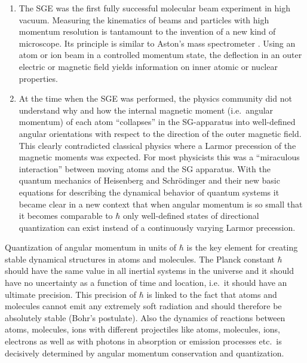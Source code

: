 \documentclass{article}
\begin{document}
\begin{enumerate}
\item The SGE was the first fully successful molecular beam experiment in high vacuum. Measuring the kinematics of beams and particles with high momentum resolution is tantamount to the invention of a new kind of microscope. Its principle is similar to Aston's mass spectrometer \citep{AstonF1919Spectrograph}. Using an atom or ion beam in a controlled momentum state, the deflection in an outer electric or magnetic field yields information on inner atomic or nuclear properties. 
\item At the time when the SGE was performed, the physics community did not understand why and how the internal magnetic moment (i.e.\ angular momentum) of each atom ``collapses'' in the SG-apparatus into well-defined angular orientations with respect to the direction of the outer magnetic field. This clearly contradicted classical physics where a Larmor precession of the magnetic moments was expected. For most physicists this was a ``miraculous interaction'' between moving atoms and the SG apparatus. With the quantum mechanics of Heisenberg and Schrödinger 
and their new basic equations for describing the dynamical behavior of quantum systems it became clear in a new context that when angular momentum is so small that it becomes comparable to $\hbar$ only well-defined states of directional quantization can exist instead of a continuously varying Larmor precession.
\end{enumerate}

Quantization of angular momentum in units of $\hbar$ is the key element for creating stable dynamical structures in atoms and molecules. The Planck constant $\hbar$ should have the same value in all inertial systems in the universe and it should have no uncertainty as a function of time and location, i.e.\ it should have an ultimate precision. This precision of $\hbar$ is linked to the fact that atoms and molecules cannot emit any extremely soft radiation and should therefore be absolutely stable (Bohr's postulate). Also the dynamics of reactions between atoms, molecules, ions with different projectiles like atoms, molecules, ions, electrons as well as with photons in absorption or emission processes etc.\ is decisively determined by angular momentum conservation and quantization. 
\end{document}
